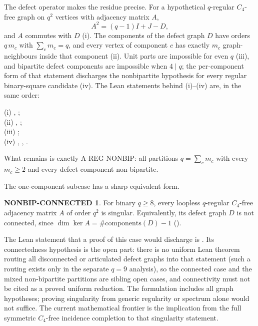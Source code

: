 \documentclass{anvil-paper}
\newcommand{\NONBIP}{\mathrm{A\text{-}REG\text{-}NONBIP}}
\theoremstyle{definition}
\newtheorem*{nonbipconn}{NONBIP-CONNECTED}
\begin{document}
The defect operator makes the residue precise. For a hypothetical $q$-regular $C_4$-free graph on $q^2$ vertices with adjacency matrix $A$,
\[
A^2=(q-1)I+J-D,
\]
and $A$ commutes with $D$ (i). The components of the defect graph $D$ have orders $q\,m_c$ with $\sum_c m_c=q$, and every vertex of component $c$ has exactly $m_c$ graph-neighbours inside that component (ii). Unit parts are impossible for even $q$ (iii), and bipartite defect components are impossible when $4\mid q$; the per-component form of that statement discharges the nonbipartite hypothesis for every regular binary-square candidate (iv). The Lean statements behind (i)--(iv) are, in the same order:
\begin{flushleft}\small
(i) , ;\\
(ii) , ;\\
(iii) ;\\
(iv) , , .
\end{flushleft}
What remains is exactly $\NONBIP$: all partitions $q=\sum_c m_c$ with every $m_c\ge 2$ and every defect component non-bipartite.

The one-component subcase has a sharp equivalent form.

\begin{nonbipconn}
For binary $q\ge 8$, every loopless $q$-regular $C_4$-free adjacency matrix $A$ of order $q^2$ is singular. Equivalently, its defect graph $D$ is not connected, since $\dim\ker A=\#\mathrm{components}(D)-1$ ().
\end{nonbipconn}

The Lean statement that a proof of this case would discharge is . Its connectedness hypothesis is the open part: there is no uniform Lean theorem routing all disconnected or articulated defect graphs into that statement (such a routing exists only in the separate $q=9$ analysis), so the connected case and the mixed non-bipartite partitions are sibling open cases, and connectivity must not be cited as a proved uniform reduction. The formulation includes all graph hypotheses; proving singularity from generic regularity or spectrum alone would not suffice. The current mathematical frontier is the implication from the full symmetric $C_4$-free incidence completion to that singularity statement.
\end{document}
